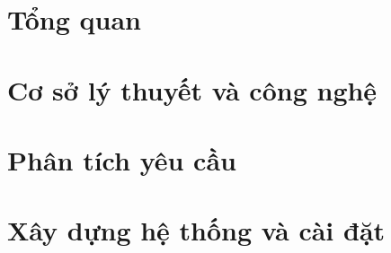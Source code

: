 \documentclass[a4paper,12pt,oneside]{report}
\theoremstyle{definition}
\begin{document}
\chapter{Tổng quan}


\newpage
\pagestyle{fancy} %
\chapter{Cơ sở lý thuyết và công nghệ}


\newpage
\pagestyle{fancy} %
\chapter{Phân tích yêu cầu}


\newpage
\pagestyle{fancy} %
\chapter{Xây dựng hệ thống và cài đặt}


\newpage
{}
\nocite{*} %
\pagestyle{plain}
\printbibliography %
\end{document}
